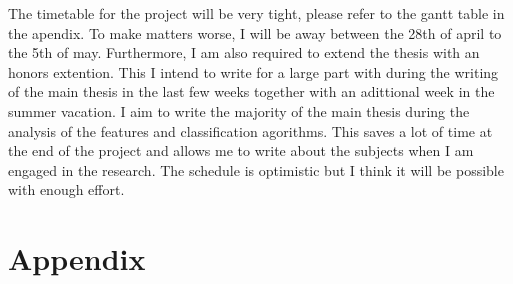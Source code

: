 \documentclass{article}
\begin{document}
The timetable for the project will be very tight, please refer to the gantt
table in the apendix. To make matters worse, I will be away between the 28th of
april to the 5th of may. Furthermore, I am also required to extend the thesis
with an honors extention. This I intend to write for a large part with during
the writing of the main thesis in the last few weeks together with an
adittional week in the summer vacation. I aim to write the majority of the main
thesis during the analysis of the features and classification agorithms. This
saves a lot of time at the end of the project and allows me to write about the
subjects when I am engaged in the research. The schedule is optimistic but
I think it will be possible with enough effort.

\printbibliography

\section{Appendix}
\end{document}
